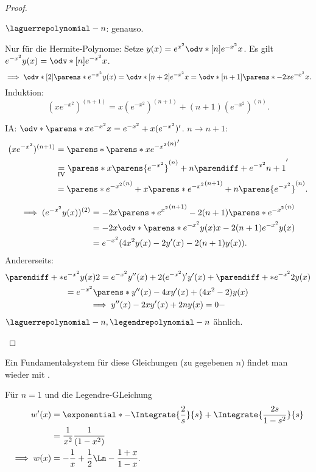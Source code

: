 \begin{proof}
\begin{proofdescription}
    \( \laguerrepolynomial-{n}{} \): genauso.
    \item[\ordinalnum{2} \Beh] Nur für die Hermite-Polynome: Setze \( y(x)=e^{x^2}\odv*[n]{e^{-x^2}}{x} \). Es gilt \( e^{-x^2}y(x)=\odv*[n]{e^{-x^2}}{x} \).
    \begin{equation*}
      \implies \odv*[2]{\parens*{e^{-x^2}y(x)}}=\odv*[n+2]{e^{-x^2}}{x}=\odv*[n+1]{\parens*{-2xe^{-x^2}}}{x}.
    \end{equation*}
    Induktion:
    \begin{equation*}
      (xe^{-x^2})^{(n+1)}=x(e^{-x^2})^{(n+1)}+(n+1)(e^{-x^2})^{(n)}.
    \end{equation*}
    \begin{subproof}
      IA\@: \( \odv*{\parens*{xe^{-x^2}}}{x}=e^{-x^2}+x(e^{-x^2})' \).
      \( n\to n+1 \):
      \begin{align*}
        (xe^{-x^2})^{(n+1)}&=\parens*{\parens*{xe^{-x^2}}^{(n)}}'\\
        &\underset{\text{IV}}{=}\parens*{x\parens{e^{-x^2}}^{(n)}+n\parendiff+{e^{-x^2}}{n+1}}'\\
        &=\parens*{e^{-x^2}}^{(n)}+x\parens*{e^{-x^2}}^{(n+1)}+n\parens{e^{-x^2}}^{(n)}.
      \end{align*}
    \end{subproof}
    \begin{align*}
      \implies (e^{-x^2}y(x))^{(2)}&=-2x\parens*{e^{x^2}}^{(n+1)}-2(n+1)\parens*{e^{-x^2}}^{(n)}\\
      &=-2x\odv*{\parens*{e^{-x^2}y(x)}}{x}-2(n+1)e^{-x^2}y(x)\\
      &=e^{-x^2}(4x^2y(x)-2y'(x)-2(n+1)y(x)).
    \end{align*}
    Andererseits:
    \begin{gather*}
      \parendiff+*{e^{-x^2}y(x)}{2}=e^{-x^2}y''(x)+2(e^{-x^2})'y'(x)+\parendiff+*{e^{-x^2}}{2}y(x)\\
      =e^{-x^2}\parens*{y''(x)-4xy'(x)+(4x^2-2)y(x)}\\
      \implies y''(x)-2xy'(x)+2ny(x)=0-
    \end{gather*}
    \( \laguerrepolynomial-{n}{},\legendrepolynomial-{n}{} \) ähnlich.
  \end{proofdescription}  
\end{proof}
Ein Fundamentalsystem für diese Gleichungen (zu gegebenen \( n \)) findet man \zb wieder mit .

\begin{beispiel*}
  Für \( n=1 \) und die Legendre-GLeichung
  \begin{align*}
    w'(x)&=\exponential*{-\Integrate{\frac{2}{s}}{s}+\Integrate{\frac{2s}{1-s^2}}{s}}\\
    &=\frac{1}{x^2}\frac{1}{(1-x^2)}\\
    \implies w(x)&=-\frac{1}{x}+\frac{1}{2}\Ln-{\frac{1+x}{1-x}}.
  \end{align*}
\end{beispiel*}
